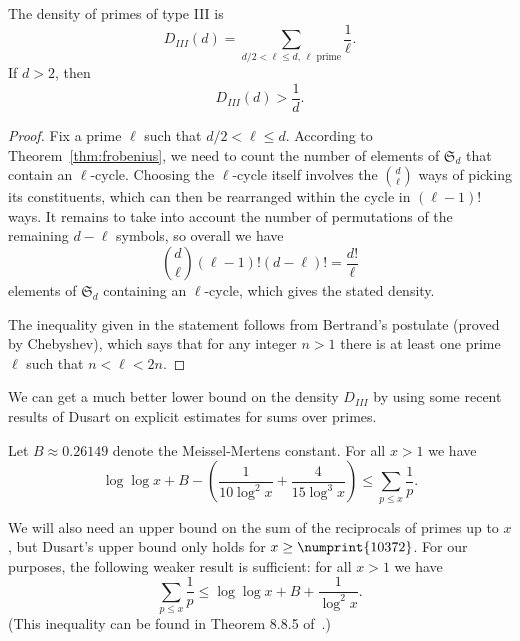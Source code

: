 \documentclass{book}
\renewcommand{\SS}{\mathfrak{S}}
\begin{document}
\begin{proposition}
  The density of primes of type III is
  \begin{equation*}
    D_{III}(d)=\sum_{d/2<\ell\leq d, \,\ell\text{ prime}} \frac{1}{\ell}.
  \end{equation*}
  If $d>2$, then
  \begin{equation*}
    D_{III}(d)>\frac{1}{d}.
  \end{equation*}
\end{proposition}
\begin{proof}
  Fix a prime $\ell$ such that $d/2<\ell\leq d$.  According to
  Theorem~\ref{thm:frobenius}, we need to count the number of elements of
  $\SS_d$ that contain an $\ell$-cycle.  Choosing the $\ell$-cycle itself
  involves the $\binom{d}{\ell}$ ways of picking its constituents, which can
  then be rearranged within the cycle in $(\ell-1)!$ ways.  It remains to
  take into account the number of permutations of the remaining $d-\ell$ symbols,
  so overall we have
  \begin{equation*}
    \binom{d}{\ell}(\ell-1)!(d-\ell)!=\frac{d!}{\ell}
  \end{equation*}
  elements of $\SS_d$ containing an $\ell$-cycle, which gives the stated
  density.

  The inequality given in the statement follows from Bertrand's postulate
  (proved by Chebyshev), which says that for any integer $n>1$ there is at
  least one prime $\ell$ such that $n<\ell<2n$.
\end{proof}

We can get a much better lower bound on the density $D_{III}$ by using some
recent results of Dusart on explicit estimates for sums over primes.

\begin{theorem}
  Let $B\approx 0.26149$ denote the Meissel-Mertens constant.  For
  all $x>1$ we have
  \begin{equation}\label{eq:rec_lower}
    \log\log x+B-\left(\frac{1}{10\log^2 x}+\frac{4}{15\log^3 x}\right)\leq
    \sum_{p\leq x}\frac{1}{p}.
  \end{equation}
\end{theorem}

We will also need an upper bound on the sum of the reciprocals of primes up to
$x$, but Dusart's upper bound only holds for $x\geq\numprint{10372}$.  For our
purposes, the following weaker result is sufficient: for all $x>1$ we have
\begin{equation}\label{eq:rec_upper}
  \sum_{p\leq x}\frac{1}{p}\leq\log\log x + B +\frac{1}{\log^2 x}.
\end{equation}
(This inequality can be found in Theorem 8.8.5 of~\cite{BachShallit}.)
\end{document}
